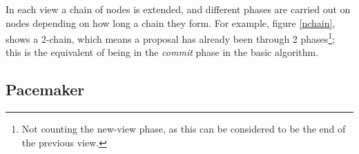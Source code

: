 In each view a chain of nodes is extended, and different phases are carried out on nodes depending on how long a chain they form. For example, figure \ref{nchain}, shows a 2-chain, which means a proposal has already been through 2 phases\footnote{Not counting the new-view phase, as this can be considered to be the end of the previous view.}; this is the equivalent of being in the \textit{commit} phase in the basic algorithm.


\subsection{Pacemaker} \label{pacemaker}

